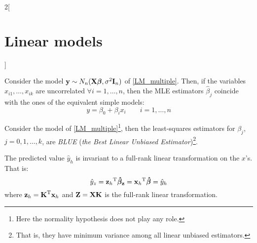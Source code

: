 \documentclass[../../../main_math.tex]{subfiles}
\begin{document}
\begin{multicols}{2}[\section{Linear models}]
\begin{proposition}
  \end{proposition}
  \begin{proposition}
    Consider the model $\boldsymbol{\mathrm{y}}\sim N_n(\boldsymbol{\mathrm{X\beta}},\sigma^2\boldsymbol{\mathrm{I}}_n)$ of \cref{LM_multiple}. Then, if the variables $x_{i1},\ldots,x_{ik}$ are uncorrelated $\forall i=1,\ldots,n$, then the MLE estimators $\hat\beta_j$ coincide with the ones of the equivalent simple models: $$y=\beta_0+\beta_i x_i\qquad i=1,\ldots,n$$
  \end{proposition}
  \begin{theorem}
    Consider the model of \cref{LM_multiple}\footnote{Here the normality hypothesis does not play any role.}, then the least-squares estimators for $\beta_j$, $j=0,1,\ldots,k$, are \emph{BLUE} (\emph{the Best Linear Unbiased Estimator})\footnote{That is, they have minimum variance among all linear unbiased estimators.}.
  \end{theorem}
  \begin{corollary}
    The predicted value $\hat{y}_h$ is invariant to a full-rank linear transformation on the $x$'s. That is: $$\hat{y}_z={\boldsymbol{\mathrm{z}}_h}^{\mathrm{T}}\boldsymbol{\mathrm{\hat{\beta}_z}}={\boldsymbol{\mathrm{x}}_h}^{\mathrm{T}}\boldsymbol{\mathrm{\hat{\beta}}}=\hat{y}_h$$ where $\boldsymbol{\mathrm{z}}_h={\boldsymbol{\mathrm{K}}}^{\mathrm{T}}\boldsymbol{\mathrm{x}}_h$ and $\boldsymbol{\mathrm{Z}}=\boldsymbol{\mathrm{XK}}$ is the full-rank linear transformation.
  \end{corollary}

\end{multicols}
\end{document}
